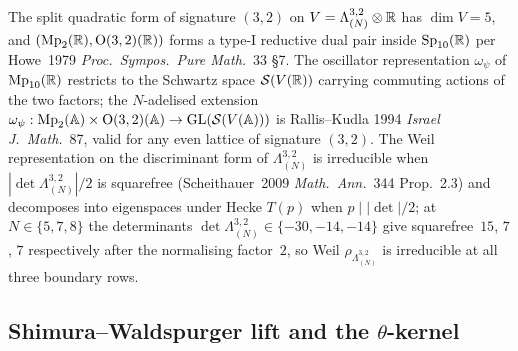 The split quadratic form of signature $(3,2)$ on $V = \Lambda^{3,2}_{(N)}
\otimes \mathbb{R}$ has $\dim V = 5$, and $(\mathrm{Mp}_2(\mathbb{R}), \mathrm{O}(3,2)(\mathbb{R}))$ forms a
type-I reductive dual pair inside $\mathrm{Sp}_{10}(\mathbb{R})$ per Howe~1979
\emph{Proc.\ Sympos.\ Pure Math.}~33 \S7.  The oscillator representation
$\omega_\psi$ of $\mathrm{Mp}_{10}(\mathbb{R})$ restricts to the Schwartz space
$\mathcal{S}(V(\mathbb{R}))$ carrying commuting actions of the two factors; the
$N$-adelised extension $\omega_\psi: \mathrm{Mp}_2(\mathbb{A}) \times \mathrm{O}(3,2)(\mathbb{A}) \to
\mathrm{GL}(\mathcal{S}(V(\mathbb{A})))$ is Rallis--Kudla 1994 \emph{Israel J.\ Math.}~87,
valid for any even lattice of signature $(3, 2)$.  The Weil
representation on the discriminant form of $\Lambda^{3,2}_{(N)}$ is
irreducible when $|\det \Lambda^{3,2}_{(N)}|/2$ is squarefree
(Scheithauer~2009 \emph{Math.\ Ann.}~344 Prop.~2.3) and decomposes into
eigenspaces under Hecke $T(p)$ when $p \mid |\det|/2$; at
$N \in \{5, 7, 8\}$ the determinants $\det \Lambda^{3, 2}_{(N)} \in
\{-30, -14, -14\}$ give squarefree~$15$, $7$, $7$ respectively after
the normalising factor~$2$, so Weil $\rho_{\Lambda^{3,2}_{(N)}}$ is
irreducible at all three boundary rows.

\subsection{Shimura--Waldspurger lift and the $\theta$-kernel}

